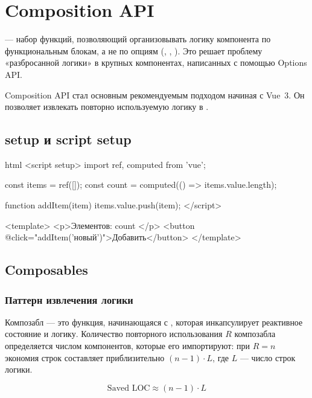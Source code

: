 \section{Composition API}

 — набор функций, позволяющий
организовывать логику компонента по функциональным блокам, а не по
опциям (, , ).  Это решает
проблему «разбросанной логики» в крупных компонентах, написанных
с помощью Options API.

Composition API стал основным рекомендуемым подходом начиная с Vue~3.
Он позволяет извлекать повторно используемую логику в
.

\subsection{setup и script setup}

\begin{code}{html}
<script setup>
import { ref, computed } from 'vue';

const items = ref([]);
const count = computed(() => items.value.length);

function addItem(item) {
  items.value.push(item);
}
</script>

<template>
  <p>Элементов: {{ count }}</p>
  <button @click="addItem('новый')">Добавить</button>
</template>
\end{code}

\subsection{Composables}

\subsubsection{Паттерн извлечения логики}

Композабл — это функция, начинающаяся с , которая
инкапсулирует реактивное состояние и логику.  Количество повторного
использования $R$ композабла определяется числом компонентов, которые
его импортируют: при $R = n$ экономия строк составляет приблизительно
$(n - 1) \cdot L$, где $L$ — число строк логики.

\begin{equation}
  \text{Saved LOC} \approx (n - 1) \cdot L
\end{equation}

